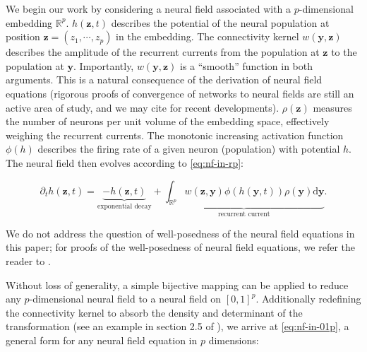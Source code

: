 \documentclass[10pt,letterpaper]{article}
\def\R{\mathbb R}
\def\Rp{\R^p}
\renewcommand{\vec}[1]{\boldsymbol{#1}}
\begin{document}
We begin our work by considering a neural field associated with a $p$-dimensional embedding $\Rp$. $h(\vec z, t)$ describes the potential of the neural population at position $\vec z=(z_1,\cdots,z_p)$ in the embedding. The connectivity kernel $w(\vec y, \vec z)$ describes the amplitude of the recurrent currents from the population at $\vec z$ to the population at $\vec y$. Importantly, $w(\vec y, \vec z)$ is a ``smooth'' function in both arguments. This is a natural consequence of the derivation of neural field equations (rigorous proofs of convergence of networks to neural fields are still an active area of study, and we may cite \cite{CheDua19,AGATHENERINE202286} for recent developments).
$\rho(\vec z)$ measures the number of neurons per unit volume of the embedding space, effectively weighing the recurrent currents. The monotonic increasing activation function $\phi(h)$ describes the firing rate of a given neuron (population) with potential $h$. The neural field then evolves according to \autoref{eq:nf-in-rp}:  

\begin{equation} \label{eq:nf-in-rp}
\partial_t h(\vec z, t) = \underbrace{-h(\vec z, t)}_\text{exponential decay} + \underbrace{\int_{\mathbb{R}^p} w(\vec z, \vec y) \phi(h(\vec y, t)) \rho(\vec y) \mathrm d \vec y}_\text{recurrent current}.
\end{equation}

We do not address the question of well-posedness of the neural field equations in this paper; for proofs of the well-posedness of neural field equations, we refer the reader to \cite{faugeras2008absolute,faugeras2009persistent,veltz2009localglobal}.

Without loss of generality, a simple bijective mapping can be applied to reduce any $p$-dimensional neural field to a neural field on $[0,1]^p$. Additionally redefining the connectivity kernel to absorb the density and determinant of the transformation (see an example in section 2.5 of \cite{nvadot2023mathesis}), we arrive at \autoref{eq:nf-in-01p}, a general form for any neural field equation in $p$ dimensions:

\end{document}
